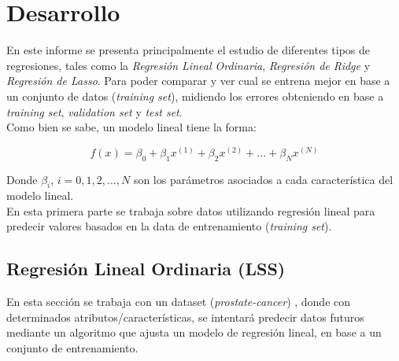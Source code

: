 \documentclass[10pt]{article}
\begin{document}
\section*{Desarrollo}
En este informe se presenta principalmente el estudio de diferentes tipos de regresiones, tales como la \textit{Regresión Lineal Ordinaria}, \textit{Regresión de Ridge} y \textit{Regresión de Lasso}. Para poder comparar y ver cual se entrena mejor en base a un conjunto de datos (\textit{training set}), midiendo los errores obteniendo en base a \textit{training set}, \textit{validation set} y \textit{test set}.\\

Como bien se sabe, un modelo lineal tiene la forma:

\begin{equation}
f(x) = \beta_0 + \beta_1 x^{(1)} + \beta_2 x^{(2)} + ... + \beta_N x^{(N)}
\label{f_rlineal}
\end{equation}

Donde $\beta_i$, $i = 0, 1, 2,..., N$ son los parámetros asociados a cada característica del modelo lineal.\\

En esta primera parte se trabaja sobre datos utilizando regresión lineal para predecir valores basados en la data de entrenamiento (\textit{training set}).

\subsection{Regresión Lineal Ordinaria (LSS)}

En esta sección se trabaja con un dataset (\textit{prostate-cancer}) \cite{friedman2001elements}, donde con determinados atributos/características, se intentará predecir datos futuros mediante un algoritmo que ajusta un modelo de regresión lineal, en base a un conjunto de entrenamiento.
\end{document}
